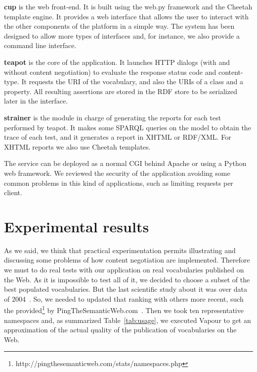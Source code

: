 \documentclass{../templates/llncs}
\begin{document}
\begin{description}

  \item \textbf{cup} is the web front-end. It is built using the web.py framework
        and the Cheetah template engine. It provides a web interface that allows 
        the user to interact with the other components of the platform in a 
        simple way. The system has been designed to allow more types 
        of interfaces and, for instance, we also provide a command line interface.

  \item \textbf{teapot} is the core of the application. It launches
        HTTP dialogs 
        (with and without content negotiation) to evaluate the response
        status code and content-type. It requests the URI of the vocabulary, and 
        also the URIs of a class and a property. All resulting assertions are 
        stored in the RDF store to be serialized later in the interface.

  \item \textbf{strainer} is the module in charge of generating the reports for
        each test performed by teapot. It makes some SPARQL%
        queries on the model to obtain the trace of each test, and it generates 
        a report in XHTML or RDF/XML. For XHTML reports we also use Cheetah 
        templates.

\end{description}

The service can be deployed as a normal CGI behind Apache or using a Python web 
framework. We reviewed the security of the application avoiding some common problems
in this kind of applications, such as limiting requests per client.

\section{\label{sec:experimental}Experimental results}

As we said, we think that practical experimentation permits illustrating and discussing 
some problems of how content negotiation are implemented. Therefore we must to do real
tests with our application on real vocabularies published on the Web. As it is impossible
to test all of it, we decided to choose a subset of the best populated vocabularies. But 
the last scientific study about it was over data of 2004~\cite{Li2005}. So, we needed to 
updated that ranking with others more recent, such the 
provided\footnote{http://pingthesemanticweb.com/stats/namespaces.php} by 
PingTheSemanticWeb.com~\cite{Bojars2007}. Then we took ten representative namespaces and,
as summarized Table~\ref{tab:usage}, we executed Vapour to get an approximation of the
actual quality of the publication of vocabularies on the Web. 
\end{document}
